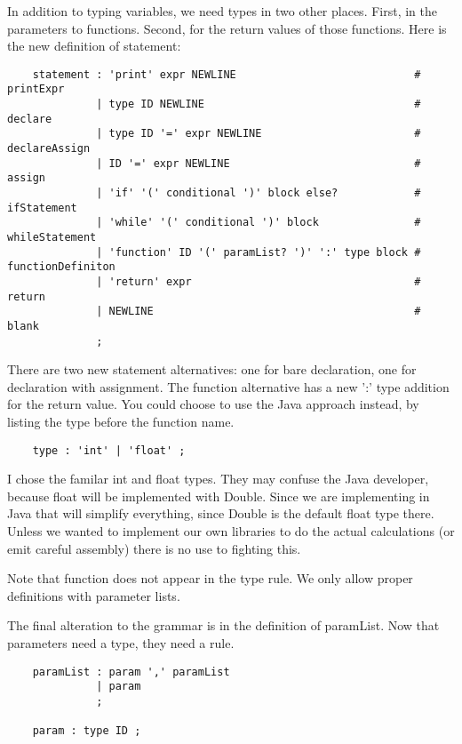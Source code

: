 In addition to typing variables, we need types in two other places.
First, in the parameters to functions. Second, for the return values
of those functions. Here is the new definition of statement:

{\footnotesize
\begin{verbatim}
    statement : 'print' expr NEWLINE                            # printExpr
              | type ID NEWLINE                                 # declare
              | type ID '=' expr NEWLINE                        # declareAssign
              | ID '=' expr NEWLINE                             # assign
              | 'if' '(' conditional ')' block else?            # ifStatement
              | 'while' '(' conditional ')' block               # whileStatement
              | 'function' ID '(' paramList? ')' ':' type block # functionDefiniton
              | 'return' expr                                   # return
              | NEWLINE                                         # blank
              ;
\end{verbatim}
}

There are two new statement alternatives: one for bare declaration, one for
declaration with assignment. The function alternative has a new ':' type
addition for the return value. You could choose to use the Java approach
instead, by listing the type before the function name.

{\footnotesize
\begin{verbatim}
    type : 'int' | 'float' ;
\end{verbatim}
}

I chose the familar int and float types. They may confuse the Java developer,
because float will be implemented with Double. Since we are implementing in
Java that will simplify everything, since Double is the default float type
there. Unless we wanted to implement our own libraries to do the actual
calculations (or emit careful assembly) there is no use to fighting this.

Note that function does not appear in the type rule. We only allow
proper definitions with parameter lists.

The final alteration to the grammar is in the definition of paramList.
Now that parameters need a type, they need a rule.

{\footnotesize
\begin{verbatim}
    paramList : param ',' paramList
              | param
              ;

    param : type ID ;
\end{verbatim}
}

